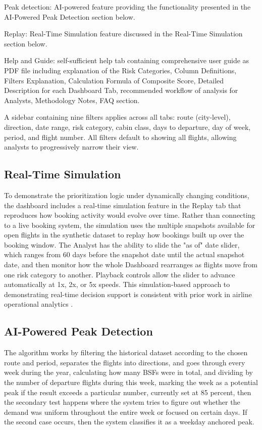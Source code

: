Peak detection: AI-powered feature providing the functionality presented in the AI-Powered Peak Detection section below.

Replay: Real-Time Simulation feature discussed in the Real-Time Simulation section below.

Help and Guide: self-sufficient help tab containing comprehensive user guide as PDF file including explanation of the Risk Categories, Column Definitions, Filters Explanation, Calculation Formula of Composite Score, Detailed Description for each Dashboard Tab, recommended workflow of analysis for Analysts, Methodology Notes, FAQ section.

A sidebar containing nine filters applies across all tabs: route (city-level), direction, date range, risk category, cabin class, days to departure, day of week, period, and flight number. All filters default to showing all flights, allowing analysts to progressively narrow their view.

\subsection{Real-Time Simulation}

To demonstrate the prioritization logic under dynamically changing conditions, the dashboard includes a real-time simulation feature in the Replay tab that reproduces how booking activity would evolve over time. Rather than connecting to a live booking system, the simulation uses the multiple snapshots available for open flights in the synthetic dataset to replay how bookings built up over the booking window. The Analyst has the ability to slide the "as of" date slider, which ranges from 60 days before the snapshot date until the actual snapshot date, and then monitor how the whole Dashboard rearranges as flights move from one risk category to another. Playback controls allow the slider to advance automatically at 1x, 2x, or 5x speeds. This simulation-based approach to demonstrating real-time decision support is consistent with prior work in airline operational analytics \citep{RakshitKrishnamurthyYu1996, WatsonWixomHoffer2006}.

\subsection{AI-Powered Peak Detection}

The algorithm works by filtering the historical dataset according to the chosen route and period, separates the flights into directions, and goes through every week during the year, calculating how many BSFs were in total, and dividing by the number of departure flights during this week, marking the week as a potential peak if the result exceeds a particular number, currently set at 85 percent, then the secondary test happens where the system tries to figure out whether the demand was uniform throughout the entire week or focused on certain days. If the second case occurs, then the system classifies it as a weekday anchored peak.

